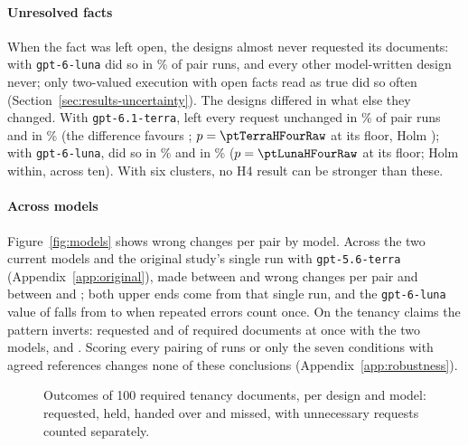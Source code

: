 \paragraph{Unresolved facts}
When the fact was left open, the designs almost never requested its documents:  with \texttt{gpt-6-luna} did so in \thLunaRPremature\% of pair runs, \casepath and every other model-written design never; only two-valued execution with open facts read as true did so often (Section~\ref{sec:results-uncertainty}). The designs differed in what else they changed. With \texttt{gpt-6.1-terra},  left every request unchanged in \thTerraRStable\% of pair runs and \casepath in \thTerraCPStable\% (the difference favours ; $p=\ptTerraHFourRaw$ at its floor, Holm \ptTerraHFour); with \texttt{gpt-6-luna}, \casepath did so in \thLunaCPStable\% and  in \thLunaRStable\% ($p=\ptLunaHFourRaw$ at its floor; Holm \ptLunaHFour{} within, \ptLunaHFourHolmAll{} across ten). With six clusters, no H4 result can be stronger than these.

\paragraph{Across models}
Figure~\ref{fig:models} shows wrong changes per pair by model. Across the two current models and the original study's single run with \texttt{gpt-5.6-terra} (Appendix~\ref{app:original}), \casepath made between \rangeCPWrongPPLo{} and \rangeCPWrongPPHi{} wrong changes per pair and  between \rangeRWrongPPLo{} and \rangeRWrongPPHi; both upper ends come from that single run, and the \texttt{gpt-6-luna} value of  falls from \thLunaRWrongPP{} to \thLunaRDedupWrongPP{} when repeated errors count once. On the tenancy claims the pattern inverts:  requested \pct{\tenTerraBoneRecall} and \pct{\tenLunaBoneRecall} of required documents at once with the two models, \casepath \pct{\tenTerraCPxRecall} and \pct{\tenLunaCPxRecall}. Scoring every pairing of runs or only the seven conditions with agreed references changes none of these conclusions (Appendix~\ref{app:robustness}).

\begin{figure}[t]
\centering
{}
\caption{Outcomes of 100 required tenancy documents, per design and model: requested, held, handed over and missed, with unnecessary requests counted separately.}
\label{fig:outcomes}
\end{figure}

